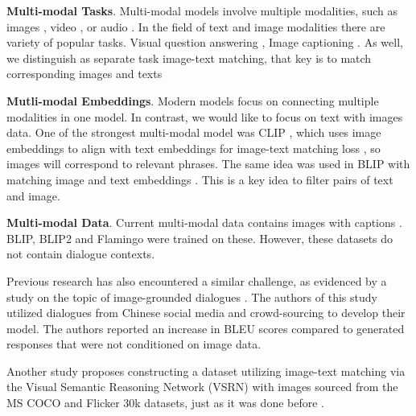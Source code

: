 \textbf{Multi-modal Tasks}. Multi-modal models involve multiple modalities, such as images \cite{blip,Dalle,sim-vlm,VinVl}, video \cite{frozen,video-qa,VideoCoCa}, or audio \cite{flow-tron,natural-speech}. In the field of text and image modalities there are variety of popular tasks. Visual question answering \cite{blip2,blip,ALBEF,ALIGN}, Image captioning \cite{kumar2022imagecaptioning,OFA,mPLUG}. As well, we distinguish as separate task image-text matching, that key is to match corresponding images and texts \cite{Radford-2021,blip,bridge-towers}

\textbf{Mutli-modal Embeddings}. Modern models \cite{GATO,kosmos-1,flamingo} focus on connecting multiple modalities in one model. In contrast, we would like to focus on text with images data. One of the strongest multi-modal model was CLIP \cite{Radford-2021}, which uses image embeddings to align with text embeddings for image-text matching loss \cite{contrastive-loss}, so images will correspond to relevant phrases. The same idea was used in BLIP \cite{blip} with matching image and text embeddings \cite{ALBEF}. This is a key idea to filter pairs of text and image.




\textbf{Multi-modal Data}. Current multi-modal data contains images with captions \cite{laion,SBU-captions,visual-genome,conceptual,ms-coco,ALIGN}. BLIP, BLIP2 and Flamingo were trained on these. However, these datasets do not contain dialogue contexts.

Previous research has also encountered a similar challenge, as evidenced by a study on the topic of image-grounded dialogues \cite{mm_chat}. The authors of this study utilized dialogues from Chinese social media and crowd-sourcing to develop their model. The authors reported an increase in BLEU \cite{bleu} scores compared to generated responses that were not conditioned on image data.

Another study \cite{Lee-2021} proposes constructing a dataset utilizing image-text matching via the Visual Semantic Reasoning Network (VSRN) \cite{li2019vsrn} with images sourced from the MS COCO \cite{ms-coco} and Flicker 30k \cite{flicker30k} datasets, just as it was done before \cite{dialogcc}. 




